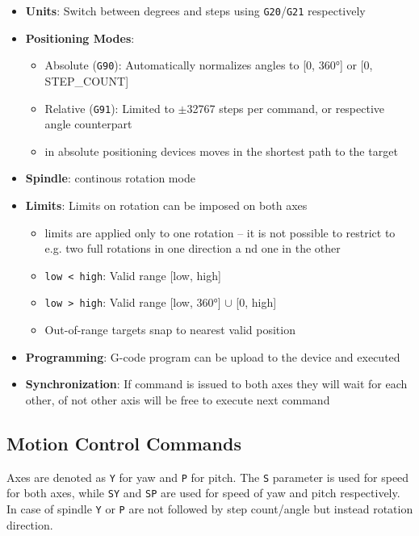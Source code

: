 \begin{itemize}
  \item \textbf{Units}: Switch between degrees and steps using \texttt{G20}/\texttt{G21} respectively
  \item \textbf{Positioning Modes}:
    \begin{itemize}
      \item Absolute (\texttt{G90}): Automatically normalizes angles to [0, 360°] or [0, STEP\_COUNT]
      \item Relative (\texttt{G91}): Limited to $\pm$32767 steps per command, or respective angle counterpart
      \item in absolute positioning devices moves in the shortest path to the target
    \end{itemize}
  \item \textbf{Spindle}: continous rotation mode
  \item \textbf{Limits}: Limits on rotation can be imposed on both axes
    \begin{itemize}
      \item limits are applied only to one rotation -- it is not possible to restrict to e.g. two full rotations in one direction a nd one in the other
      \item \texttt{low < high}: Valid range [low, high]
      \item \texttt{low > high}: Valid range [low, 360°] $\cup$ [0, high]
      \item Out-of-range targets snap to nearest valid position
    \end{itemize}
  \item \textbf{Programming}: G-code program can be upload to the device and executed
  \item \textbf{Synchronization}: If command is issued to both axes they will wait for each other, of not other axis will be free to execute next command
\end{itemize}
\newpage

\subsection*{Motion Control Commands}

Axes are denoted as \texttt{Y} for yaw and \texttt{P} for pitch. The \texttt{S} parameter is used for speed for both axes, while \texttt{SY} and \texttt{SP} are used for speed of yaw and pitch respectively. In case of spindle \texttt{Y} or \texttt{P} are not followed by step count/angle but instead rotation direction.

